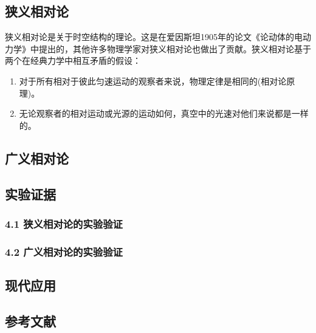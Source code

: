 \subsection{狭义相对论}

狭义相对论是关于时空结构的理论。这是在爱因斯坦1905年的论文《论动体的电动力学》中提出的，其他许多物理学家对狭义相对论也做出了贡献。狭义相对论基于两个在经典力学中相互矛盾的假设：

\begin{enumerate}
\item 对于所有相对于彼此匀速运动的观察者来说，物理定律是相同的(相对论原理)。
\item 无论观察者的相对运动或光源的运动如何，真空中的光速对他们来说都是一样的。
\end{enumerate}


\subsection{广义相对论}


\subsection{实验证据}


\subsubsection{4.1 狭义相对论的实验验证}



\subsubsection{4.2 广义相对论的实验验证}


\subsection{现代应用}


\subsection{参考文献}
